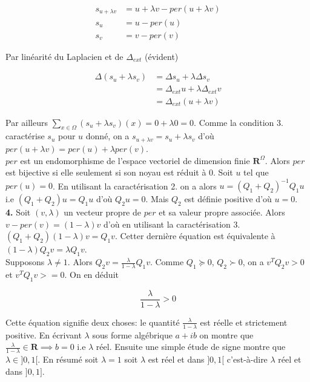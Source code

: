 \documentclass[a4paper, 11pt]{article}
\begin{document}
\begin{align*}
  s_{u+\lambda v} &= u + \lambda v - per(u+\lambda v) \\
  s_u &= u - per(u) \\
  s_v &= v - per(v)
\end{align*}

Par linéarité du Laplacien et de $\Delta_{ext}$ (évident) 

\begin{align*}
  \Delta (s_u + \lambda s_v) &= \Delta s_u + \lambda \Delta s_v \\
  &= \Delta_{ext}u + \lambda \Delta_{ext}v \\
  &= \Delta_{ext}(u+\lambda v) 
\end{align*}

Par ailleurs $\displaystyle \sum_{x \in \Omega} (s_u + \lambda s_v) (x) = 0 + \lambda 0 = 0$. Comme la condition 3.
caractérise $s_u$ pour $u$ donné, on a $s_{u+\lambda v} = s_u + \lambda s_v$ d'où $per(u + \lambda v) = per(u) +
\lambda per(v)$.  \\

$per$ est un endomorphisme de l'espace vectoriel de dimension finie $\mathbf{R}^{\Omega}$. Alors $per$ est bijective si
elle seulement si son noyau est réduit à 0. Soit $u$ tel que $per(u)=0$. En utilisant la caractérisation 2. on a alors
$u = (Q_1 + Q_2)^{-1}Q_1u$ i.e $(Q_1 + Q_2)u = Q_1u$ d'où $Q_2u = 0$. Mais $Q_2$ est définie positive d'où $u=0$. \\

\textbf{4.} Soit $(v, \lambda)$ un vecteur propre de $per$ et sa valeur propre associée. Alors $v - per(v) =
(1-\lambda)v$ d'où en utilisant la caractérisation 3. $(Q_1 + Q_2)(1-\lambda)v = Q_1 v$. Cetter dernière équation
est équivalente à $(1-\lambda)Q_2 v = \lambda Q_1 v$. \\

Supposons $\lambda \neq 1$. Alors $Q_2 v = \frac{\lambda}{1-\lambda}Q_1v$. Comme $Q_1 \succeq 0$,  $Q_2 \succ 0$, on a
$v^T Q_2 v > 0$ et $v^T Q_1 v >= 0$. On en déduit 

\begin{equation*}
  \frac{\lambda}{1-\lambda} > 0
\end{equation*}

Cette équation signifie deux choses: le quantité $\frac{\lambda}{1-\lambda}$ est réelle et strictement positive. En
écrivant $\lambda$ sous forme algébrique $a+ib$ on montre que $\frac{\lambda}{1-\lambda} \in \mathbf{R} \implies b=0$ i.e
$\lambda$ réel. Ensuite une simple étude de signe montre que $\lambda \in ]0,1[$. En résumé soit $\lambda = 1$ soit
$\lambda$ est réel et dans $]0,1[$ c'est-à-dire $\lambda$ réel et dans $]0,1]$. \\
\end{document}
